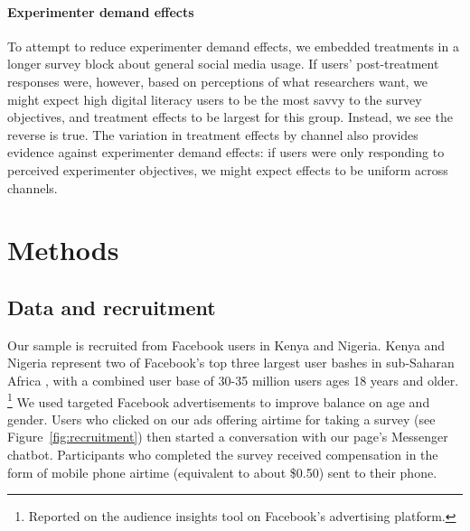 \documentclass[letterpaper, 12pt, parskip=full,DIV=10]{scrartcl}
\begin{document}

\paragraph{Experimenter demand effects}
To attempt to reduce experimenter demand effects, we embedded treatments in a longer survey block about general social media usage. If users' post-treatment responses were, however, based on perceptions of what researchers want, we might expect high digital literacy users to be the most savvy to the survey objectives, and treatment effects to be largest for this group. Instead, we see the reverse is true. The variation in treatment effects by channel also provides evidence against experimenter demand effects: if users were only responding to perceived experimenter objectives, we might expect effects to be uniform across channels. 



\section{Methods}

\subsection{Data and recruitment}\label{section:data}
Our sample is recruited from Facebook users in Kenya and Nigeria. Kenya and Nigeria represent two of Facebook's top three largest user bashes in sub-Saharan Africa \citep{africa2016top}, with a combined user base of 30-35 million users ages 18 years and older.%
\footnote{
Reported on the audience insights tool on Facebook's advertising platform.%
} 
We used targeted Facebook advertisements to improve balance on age and gender. Users who clicked on our ads offering airtime for taking a survey (see Figure~\ref{fig:recruitment}) then started a conversation with our page's Messenger chatbot. 
Participants who completed the survey received compensation in the form of mobile phone airtime (equivalent to about \$0.50) sent to their phone. 
\end{document}
